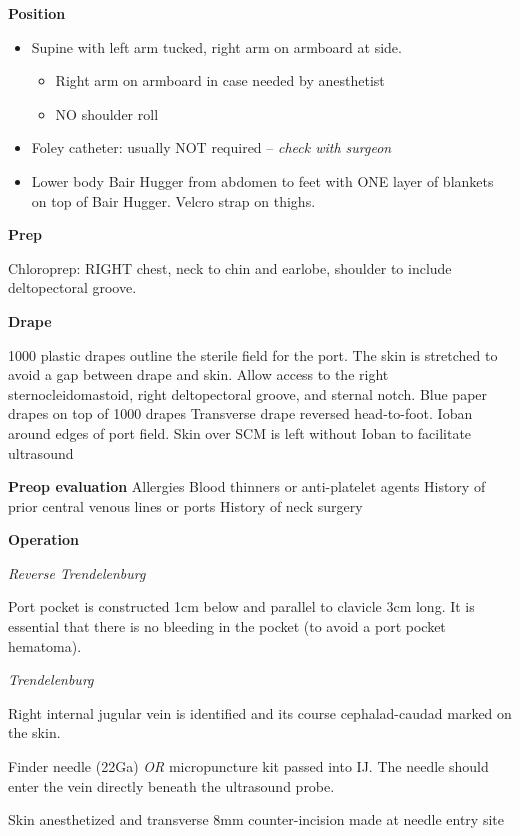 \documentclass[
]{book}
\providecommand{\tightlist}{%
  \setlength{\itemsep}{0pt}\setlength{\parskip}{0pt}}
\begin{document}
\textbf{Position}

\begin{itemize}
\tightlist
\item
  Supine with left arm tucked, right arm on armboard at side.

  \begin{itemize}
  \tightlist
  \item
    Right arm on armboard in case needed by anesthetist
  \item
    NO shoulder roll
  \end{itemize}
\item
  Foley catheter: usually NOT required -- \emph{check with surgeon}
\item
  Lower body Bair Hugger from abdomen to feet with ONE layer of blankets on top of Bair Hugger. Velcro strap on thighs.
\end{itemize}

\textbf{Prep}

Chloroprep: RIGHT chest, neck to chin and earlobe, shoulder to include deltopectoral groove.

\textbf{Drape}

1000 plastic drapes outline the sterile field for the port. The skin is stretched to avoid a gap between drape and skin. Allow access to the right sternocleidomastoid, right deltopectoral groove, and sternal notch.
Blue paper drapes on top of 1000 drapes
Transverse drape reversed head-to-foot.
Ioban around edges of port field. Skin over SCM is left without Ioban to facilitate ultrasound

\textbf{Preop evaluation}
Allergies
Blood thinners or anti-platelet agents
History of prior central venous lines or ports
History of neck surgery

\textbf{Operation}

\emph{Reverse Trendelenburg}

Port pocket is constructed 1cm below and parallel to clavicle 3cm long. It is essential that there is no bleeding in the pocket (to avoid a port pocket hematoma).

\emph{Trendelenburg}

Right internal jugular vein is identified and its course cephalad-caudad marked on the skin.

Finder needle (22Ga) \emph{OR} micropuncture kit passed into IJ. The needle should enter the vein directly beneath the ultrasound probe.

Skin anesthetized and transverse 8mm counter-incision made at needle entry site
\end{document}
